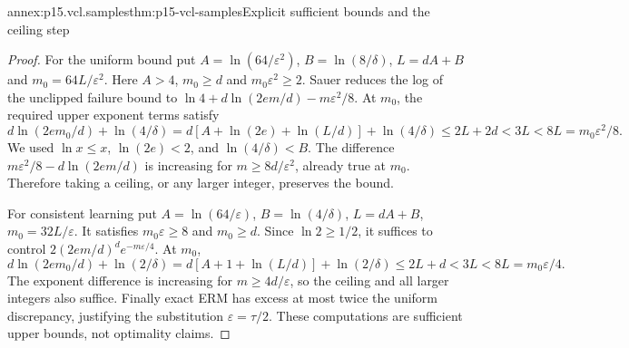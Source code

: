 \begin{annexitem}{annex:p15.vcl.samples}{thm:p15-vcl-samples}{Explicit sufficient bounds and the ceiling step}
\begin{proof}
For the uniform bound put \(A=\ln(64/\varepsilon^2)\),
\(B=\ln(8/\delta)\), \(L=dA+B\) and \(m_0=64L/\varepsilon^2\).
Here \(A>4\), \(m_0\geq d\) and \(m_0\varepsilon^2\geq2\).
Sauer reduces the log of the unclipped failure bound to
\(\ln4+d\ln(2em/d)-m\varepsilon^2/8\).
At \(m_0\), the required upper exponent terms satisfy
\[
 d\ln(2em_0/d)+\ln(4/\delta)
 =d[A+\ln(2e)+\ln(L/d)]+\ln(4/\delta)
 \leq2L+2d<3L<8L=m_0\varepsilon^2/8.
\]
We used \(\ln x\leq x\), \(\ln(2e)<2\), and
\(\ln(4/\delta)<B\). The difference
\(m\varepsilon^2/8-d\ln(2em/d)\) is increasing for
\(m\geq8d/\varepsilon^2\), already true at \(m_0\).
Therefore taking a ceiling, or any larger integer, preserves the bound.

For consistent learning put \(A=\ln(64/\varepsilon)\),
\(B=\ln(4/\delta)\), \(L=dA+B\), \(m_0=32L/\varepsilon\).
It satisfies \(m_0\varepsilon\geq8\) and \(m_0\geq d\).
Since \(\ln2\geq1/2\), it suffices to control
\(2(2em/d)^d e^{-m\varepsilon/4}\). At \(m_0\),
\[
 d\ln(2em_0/d)+\ln(2/\delta)
 =d[A+1+\ln(L/d)]+\ln(2/\delta)
 \leq2L+d<3L<8L=m_0\varepsilon/4.
\]
The exponent difference is increasing for \(m\geq4d/\varepsilon\),
so the ceiling and all larger integers also suffice. Finally exact ERM
has excess at most twice the uniform discrepancy, justifying the
substitution \(\varepsilon=\tau/2\). These computations are sufficient
upper bounds, not optimality claims.
\end{proof}
\end{annexitem}


